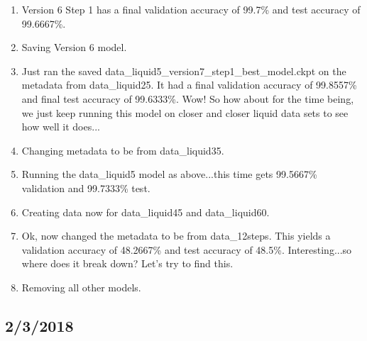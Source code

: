 \documentclass[12pt,reqno]{amsart}
\numberwithin{equation}{section}
\begin{document}
\begin{enumerate}
\item Version 6 Step 1 has a final validation accuracy of 99.7\% and test accuracy of 99.6667\%.  
\item Saving Version 6 model.  
\item Just ran the saved data\_liquid5\_version7\_step1\_best\_model.ckpt on the metadata from data\_liquid25.  It had a final validation accuracy of 99.8557\% and final test accuracy of 99.6333\%.  Wow!  So how about for the time being, we just keep running this model on closer and closer liquid data sets to see how well it does...
\item Changing metadata to be from data\_liquid35.  
\item Running the data\_liquid5 model as above...this time gets 99.5667\% validation and 99.7333\% test.  
\item Creating data now for data\_liquid45 and data\_liquid60.  
\item Ok, now changed the metadata to be from data\_12steps.  This yields a validation accuracy of 48.2667\% and test accuracy of 48.5\%.  Interesting...so where does it break down?  Let's try to find this. 
\item Removing all other models.  

\end{enumerate}

\subsection{2/3/2018}
\end{document}
